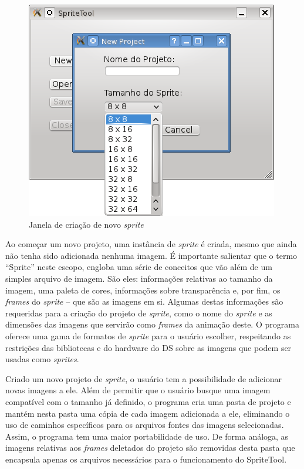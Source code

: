 \documentclass[brazil]{abnt}
\begin{document}
\begin{figure}[h!]
\centering
\includegraphics{imgs/spritetool1.png}
\caption{Janela de criação de novo \textit{sprite}} 
\end{figure}

Ao começar um novo projeto, uma instância de \textit{sprite} é criada, mesmo que ainda não tenha sido adicionada nenhuma imagem. É importante salientar que o termo “Sprite” neste escopo, engloba uma série de conceitos que vão além de um simples arquivo de imagem. São eles: informações relativas ao tamanho da imagem, uma paleta de cores, informações sobre transparência e, por fim, os \textit{frames} do \textit{sprite} – que são as imagens em si.
Algumas destas informações são requeridas para a criação do projeto de \textit{sprite}, como o nome do \textit{sprite} e as dimensões das imagens que servirão como \textit{frames} da animação deste. O programa oferece uma gama de formatos de \textit{sprite} para o usuário escolher, respeitando as restrições das bibliotecas e do hardware do DS sobre as imagens que podem ser usadas como \textit{sprites}.

Criado um novo projeto de \textit{sprite}, o usuário tem a possibilidade de adicionar novas imagens a ele. Além de permitir que o usuário busque uma imagem compatível com o tamanho já definido, o programa cria uma pasta de projeto e mantém nesta pasta uma cópia de cada imagem adicionada a ele, eliminando o uso de caminhos específicos para os arquivos fontes das imagens selecionadas. Assim, o programa tem uma maior portabilidade de uso. De forma análoga, as imagens relativas aos \textit{frames} deletados do projeto são removidas desta pasta que encapsula apenas os arquivos necessários para o funcionamento do SpriteTool.
\end{document}
